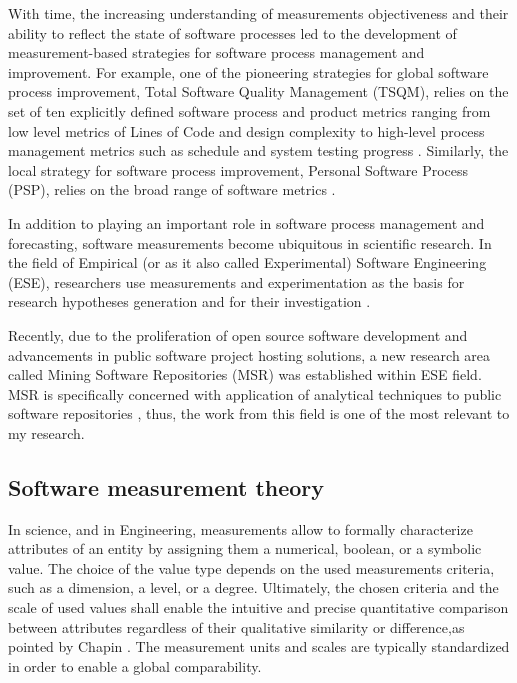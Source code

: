 With time, the increasing understanding of measurements objectiveness and their ability to reflect the state 
of software processes led to the development of measurement-based strategies for software process management
and improvement. 
For example, one of the pioneering strategies for global software process improvement, 
Total Software Quality Management (TSQM), relies on the set of ten explicitly defined software 
process and product metrics ranging from low level metrics of Lines of Code and design complexity to 
high-level process management metrics such as schedule and system testing progress \cite{citeulike:13071448}.
Similarly, the local strategy for software process improvement, Personal Software Process (PSP), relies on 
the broad range of software metrics \cite{citeulike:13072239}.

In addition to playing an important role in software process management and forecasting, software 
measurements become ubiquitous in scientific research. 
In the field of Empirical (or as it also called Experimental) Software Engineering (ESE), 
researchers use measurements and experimentation as the basis for research hypotheses 
generation and for their investigation \cite{citeulike:766768}. 

Recently, due to the proliferation of open source software development and advancements in public software
project hosting solutions, a new research area called Mining Software Repositories (MSR) was established 
within ESE field. MSR is specifically concerned with application of analytical techniques to public software 
repositories \cite{citeulike:12550438} \cite{citeulike:4534888} \cite{citeulike:2710928}, thus, the work from 
this field is one of the most relevant to my research.

\subsection{Software measurement theory}
In science, and in Engineering, measurements allow to formally characterize attributes of an entity 
by assigning them a numerical, boolean, or a symbolic value. 
The choice of the value type depends on the used measurements criteria, such as a dimension, a level, 
or a degree. Ultimately, the chosen criteria and the scale of used values shall enable the intuitive 
and precise quantitative comparison between attributes regardless of their qualitative similarity or 
difference,as pointed by Chapin \cite{citeulike:13158806}. 
The measurement units and scales are typically standardized in order to enable a global comparability.


